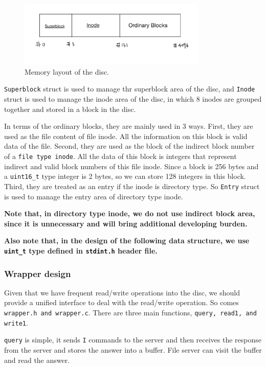 \begin{figure}[!h]
    \centering
    \includegraphics[width=0.8\textwidth]{fig/layout.jpeg}
    \caption{Memory layout of the disc.}
    \label{fig:layout}
\end{figure}

\texttt{Superblock} struct is used to manage thr superblock area of the disc, and \texttt{Inode} struct is used to manage the inode area of the disc, in which 8 inodes are grouped together and stored in a block in the disc.

In terms of the ordinary blocks, they are mainly used in 3 ways. First, they are used as the file content of file inode. All the information on this block is valid data of the file. Second, they are used as the block of the indirect block number of a \texttt{file type inode}.
All the data of this block is integers that represent indirect and valid block numbers of this file inode. Since a block is 256 bytes and a \texttt{uint16\_t} type integer is 2 bytes, so we can store 128 integers in this block. 
Third, they are treated as an entry if the inode is directory type. So \texttt{Entry} struct is used to manage the entry area of directory type inode.

\textbf{Note that, in directory type inode, we do not use indirect block area, since it is unnecessary and will bring additional developing burden.}

\textbf{Also note that, in the design of the following data structure, we use \texttt{uint\_t} type defined in \texttt{stdint.h} header file.}

\subsubsection{Wrapper design}
Given that we have frequent read/write operations into the disc, we should provide a unified interface to deal with the read/write operation. So comes \texttt{wrapper.h and wrapper.c}.
There are three main functions, \texttt{query, read1, and write1}.

\texttt{query} is simple, it sends \texttt{I} commands to the server and then receives the response from the server and stores the answer into a buffer. File server can visit the buffer and read the answer.

